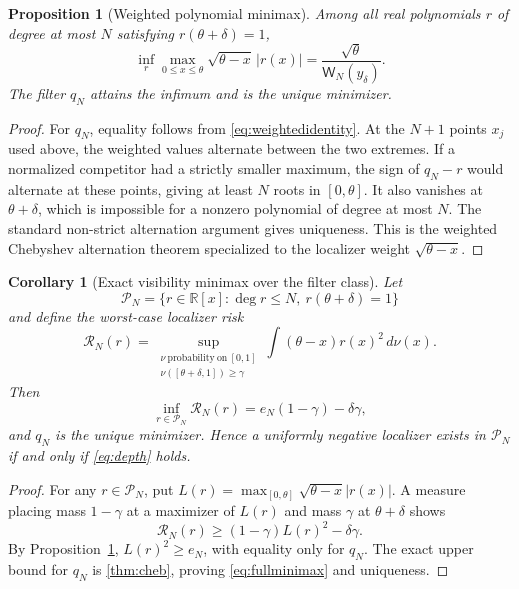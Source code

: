 \documentclass[11pt]{article}
\newtheorem{proposition}[theorem]{Proposition}
\newtheorem{corollary}[theorem]{Corollary}
\theoremstyle{definition}
\theoremstyle{remark}
\begin{document}
\begin{proposition}[Weighted polynomial minimax]        \label{prop:minimax}
Among all real polynomials $r$ of degree at most $N$ satisfying
$r(\theta+\delta)=1$,
\begin{equation}
 \inf_r\max_{0\leq x\leq\theta}
 \sqrt{\theta-x}\,|r(x)|
 =\frac{\sqrt\theta}{\mathsf W_N(y_\delta)}.          \label{eq:minimax}
\end{equation}
The filter $q_N$ attains the infimum and is the unique minimizer.
\end{proposition}

\begin{proof}
For $q_N$, equality follows from \eqref{eq:weightedidentity}.  At the $N+1$
points $x_j$ used above, the weighted values alternate between the two
extremes.  If a normalized competitor had a strictly smaller maximum, the
sign of $q_N-r$ would alternate at these points, giving at least $N$ roots in
$[0,\theta]$.  It also vanishes at $\theta+\delta$, which is impossible for a
nonzero polynomial of degree at most $N$.  The standard non-strict
alternation argument gives uniqueness.  This is the weighted Chebyshev
alternation theorem specialized to the localizer weight $\sqrt{\theta-x}$.
\end{proof}

\begin{corollary}[Exact visibility minimax over the filter class]
\label{cor:visibilityminimax}
Let
\[
 \mathcal P_N=\{r\in\mathbb R[x]:\deg r\leq N,
                    \ r(\theta+\delta)=1\}
\]
and define the worst-case localizer risk
\[
 \mathcal R_N(r)=
 \sup_{\substack{\nu\ \mathrm{probability\ on}\ [0,1]\\
                  \nu([\theta+\delta,1])\geq\gamma}}
 \int(\theta-x)r(x)^2\,d\nu(x).
\]
Then
\begin{equation}
 \inf_{r\in\mathcal P_N}\mathcal R_N(r)
 =e_N(1-\gamma)-\delta\gamma,                         \label{eq:fullminimax}
\end{equation}
and $q_N$ is the unique minimizer.  Hence a uniformly negative localizer exists
in $\mathcal P_N$ if and only if \eqref{eq:depth} holds.
\end{corollary}

\begin{proof}
For any $r\in\mathcal P_N$, put
$L(r)=\max_{[0,\theta]}\sqrt{\theta-x}|r(x)|$.  A measure placing mass
$1-\gamma$ at a maximizer of $L(r)$ and mass $\gamma$ at
$\theta+\delta$ shows
\[
 \mathcal R_N(r)\geq(1-\gamma)L(r)^2-\delta\gamma.
\]
By Proposition~\ref{prop:minimax}, $L(r)^2\geq e_N$, with equality only for
$q_N$.
The exact upper bound for $q_N$ is \cref{thm:cheb}, proving
\eqref{eq:fullminimax} and uniqueness.
\end{proof}
\end{document}
